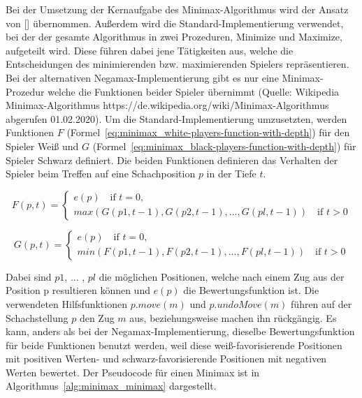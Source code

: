 Bei der Umsetzung der Kernaufgabe des Minimax-Algorithmus wird der Ansatz von [\cite{Knuth1975}] übernommen.
Außerdem wird die Standard-Implementierung verwendet, bei der der gesamte Algorithmus in zwei Prozeduren, Minimize und  Maximize, aufgeteilt wird.
Diese führen dabei jene Tätigkeiten aus, welche die Entscheidungen des minimierenden bzw. maximierenden Spielers repräsentieren.
Bei der alternativen Negamax-Implementierung gibt es nur eine Minimax-Prozedur welche die Funktionen beider Spieler übernimmt (Quelle: Wikipedia Minimax-Algorithmus https://de.wikipedia.org/wiki/Minimax-Algorithmus abgerufen 01.02.2020).
Um die Standard-Im\-ple\-men\-tie\-rung umzusetzten, werden Funktionen $F$ (Formel~\ref{eq:minimax_white-players-function-with-depth}) für den Spieler Weiß und $G$ (Formel~\ref{eq:minimax_black-players-function-with-depth}) für Spieler Schwarz definiert. Die beiden Funktionen definieren das Verhalten der Spieler beim Treffen auf eine Schachposition $p$ in der Tiefe $t$.

\begin{equation} \label{eq:minimax_white-players-function-with-depth}
    F(p,t) =
    \begin{cases}
        e(p) \quad \text{if }t=0,\\
        max(G(p1, t-1), G(p2, t-1), ... , G(pl, t-1)) \quad \text{if } t > 0
    \end{cases}
\end{equation}

\begin{equation} \label{eq:minimax_black-players-function-with-depth}
    G(p,t) =
    \begin{cases}
        e(p) \quad \text{if }t=0,\\
        min(F(p1, t-1), F(p2, t-1), ... , F(pl, t-1)) \quad \text{if } t > 0
    \end{cases}
\end{equation}

Dabei sind $p1$, ... , $pl$ die möglichen Positionen, welche nach einem Zug aus der Position p resultieren können und $e(p)$ die Bewertungsfunktion ist.
Die verwendeten Hilfsfunktionen $p.move(m)$ und $p.undoMove(m)$ führen auf der Schachstellung $p$ den Zug $m$ aus, beziehungsweise machen ihn rückgängig.
Es kann, anders als bei der Negamax-Implementierung, dieselbe Bewertungsfunktion für beide Funktionen benutzt werden, weil diese weiß-favorisierende Positionen mit positiven Werten- und schwarz-favorisierende Positionen mit negativen Werten bewertet.
Der Pseudocode für einen Minimax ist in Algorithmus~\ref{alg:minimax_minimax} dargestellt.

